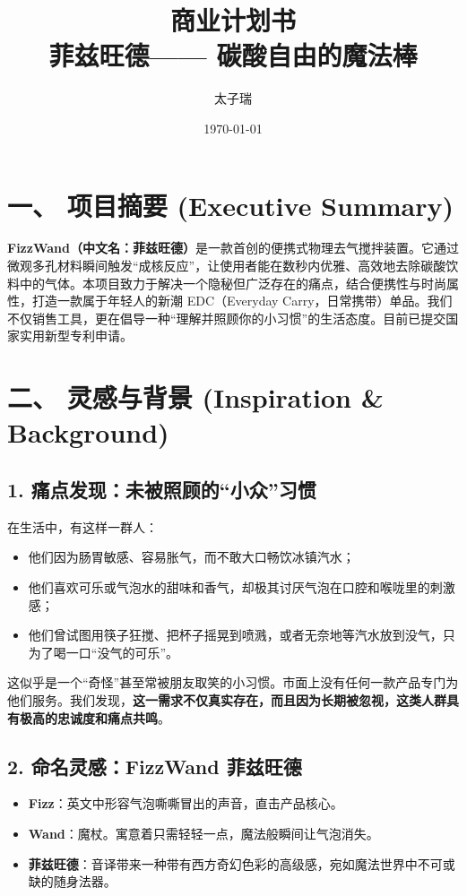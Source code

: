 \documentclass[a4paper,12pt]{ctexart}
\title{\Huge \textbf{商业计划书}\\ \vspace{0.5cm} \Large 菲兹旺德—— 碳酸自由的魔法棒}
\author{太子瑞}
\date{\today}
\begin{document}
\maketitle
\thispagestyle{empty}
\newpage

\tableofcontents
\newpage

\section{一、 项目摘要 (Executive Summary)}
\textbf{FizzWand（中文名：菲兹旺德）}是一款首创的便携式物理去气搅拌装置。它通过微观多孔材料瞬间触发“成核反应”，让使用者能在数秒内优雅、高效地去除碳酸饮料中的气体。本项目致力于解决一个隐秘但广泛存在的痛点，结合便携性与时尚属性，打造一款属于年轻人的新潮 EDC（Everyday Carry，日常携带）单品。我们不仅销售工具，更在倡导一种“理解并照顾你的小习惯”的生活态度。目前已提交国家实用新型专利申请。

\section{二、 灵感与背景 (Inspiration \& Background)}
\subsection{1. 痛点发现：未被照顾的“小众”习惯}
在生活中，有这样一群人：
\begin{itemize}
    \item 他们因为肠胃敏感、容易胀气，而不敢大口畅饮冰镇汽水；
    \item 他们喜欢可乐或气泡水的甜味和香气，却极其讨厌气泡在口腔和喉咙里的刺激感；
    \item 他们曾试图用筷子狂搅、把杯子摇晃到喷溅，或者无奈地等汽水放到没气，只为了喝一口“没气的可乐”。
\end{itemize}
这似乎是一个“奇怪”甚至常被朋友取笑的小习惯。市面上没有任何一款产品专门为他们服务。我们发现，\textbf{这一需求不仅真实存在，而且因为长期被忽视，这类人群具有极高的忠诚度和痛点共鸣}。

\subsection{2. 命名灵感：FizzWand 菲兹旺德}
\begin{itemize}
    \item \textbf{Fizz}：英文中形容气泡嘶嘶冒出的声音，直击产品核心。
    \item \textbf{Wand}：魔杖。寓意着只需轻轻一点，魔法般瞬间让气泡消失。
    \item \textbf{菲兹旺德}：音译带来一种带有西方奇幻色彩的高级感，宛如魔法世界中不可或缺的随身法器。
\end{itemize}
\end{document}
